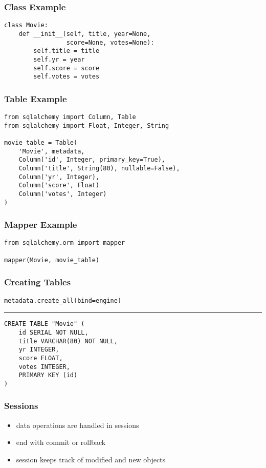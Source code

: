 \documentclass[dvipsnames]{beamer}
\theoremstyle{plain}
\begin{document}
\begin{frame}[fragile]
  \frametitle{Class Example}

  \begin{lstlisting}
class Movie:
    def __init__(self, title, year=None,
                 score=None, votes=None):
        self.title = title
        self.yr = year
        self.score = score
        self.votes = votes
  \end{lstlisting}
\end{frame}

\begin{frame}[fragile]
  \frametitle{Table Example}

  \begin{lstlisting}
from sqlalchemy import Column, Table
from sqlalchemy import Float, Integer, String

movie_table = Table(
    'Movie', metadata,
    Column('id', Integer, primary_key=True),
    Column('title', String(80), nullable=False),
    Column('yr', Integer),
    Column('score', Float)
    Column('votes', Integer)
)
  \end{lstlisting}
\end{frame}

\begin{frame}[fragile]
  \frametitle{Mapper Example}

  \begin{lstlisting}
from sqlalchemy.orm import mapper

mapper(Movie, movie_table)
  \end{lstlisting}
\end{frame}

\begin{frame}[fragile]
  \frametitle{Creating Tables}

  \begin{lstlisting}
metadata.create_all(bind=engine)
  \end{lstlisting}
  \hrule

  \begin{lstlisting}[language=FullSQL]
CREATE TABLE "Movie" (
    id SERIAL NOT NULL,
    title VARCHAR(80) NOT NULL,
    yr INTEGER,
    score FLOAT,
    votes INTEGER,
    PRIMARY KEY (id)
)
  \end{lstlisting}
\end{frame}

\begin{frame}
  \frametitle{Sessions}

  \begin{itemize}
    \item data operations are handled in sessions
    \item end with commit or rollback
    \item session keeps track of modified and new objects
  \end{itemize}
\end{frame}
\end{document}

